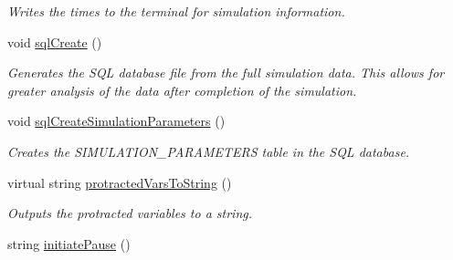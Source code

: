 \begin{DoxyCompactItemize}
\begin{DoxyCompactList}\small\item\em Writes the times to the terminal for simulation information. \end{DoxyCompactList}\item 
void \hyperlink{class_tree_ae784a6ed362f6c5263ee797759f715b6}{sql\+Create} ()\hypertarget{class_tree_ae784a6ed362f6c5263ee797759f715b6}{}\label{class_tree_ae784a6ed362f6c5263ee797759f715b6}

\begin{DoxyCompactList}\small\item\em Generates the S\+QL database file from the full simulation data. This allows for greater analysis of the data after completion of the simulation. \end{DoxyCompactList}\item 
void \hyperlink{class_tree_a199f47b62b9b10917ff8b89d20c543a7}{sql\+Create\+Simulation\+Parameters} ()\hypertarget{class_tree_a199f47b62b9b10917ff8b89d20c543a7}{}\label{class_tree_a199f47b62b9b10917ff8b89d20c543a7}

\begin{DoxyCompactList}\small\item\em Creates the S\+I\+M\+U\+L\+A\+T\+I\+O\+N\+\_\+\+P\+A\+R\+A\+M\+E\+T\+E\+RS table in the S\+QL database. \end{DoxyCompactList}\item 
virtual string \hyperlink{class_tree_aa8bb5d93c7992404ede0a49bb69ccd1f}{protracted\+Vars\+To\+String} ()
\begin{DoxyCompactList}\small\item\em Outputs the protracted variables to a string. \end{DoxyCompactList}\item 
string \hyperlink{class_tree_a9b2df7fd1b61d3d70ac630f7fbfd683d}{initiate\+Pause} ()\hypertarget{class_tree_a9b2df7fd1b61d3d70ac630f7fbfd683d}{}\label{class_tree_a9b2df7fd1b61d3d70ac630f7fbfd683d}


\end{DoxyCompactItemize}
